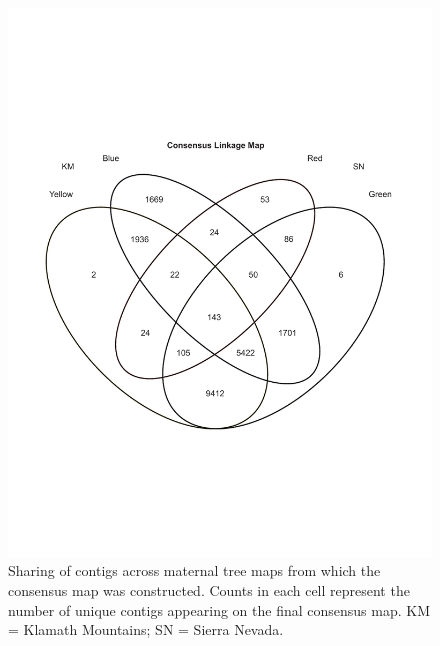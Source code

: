 \documentclass[smallextended]{svjour3}
\begin{document}
\clearpage

\begin{figure}[ht]
   \centering
 \includegraphics[width=1.0\textwidth]{Figure02_TGG}
 \caption{Sharing of contigs across maternal tree maps from which the consensus
   map was constructed. Counts in each cell represent the number of unique
   contigs appearing on the final consensus map. KM = Klamath Mountains; SN =
   Sierra Nevada.}
  \label{f:Figure02_TGG}
\end{figure}
 
\clearpage
\end{document}

